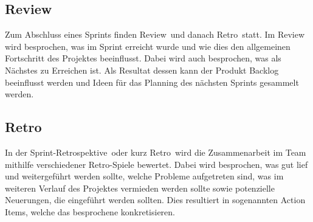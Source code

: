 \subsection{Review}
Zum Abschluss eines Sprints finden \glqq Review\grqq~und danach \glqq Retro\grqq~statt. Im Review wird besprochen, was im Sprint erreicht 
wurde und wie dies den allgemeinen Fortschritt des Projektes beeinflusst. Dabei wird auch besprochen, was als Nächstes zu Erreichen ist. 
Als Resultat dessen kann der Produkt Backlog beeinflusst werden und Ideen für das Planning des nächsten Sprints gesammelt werden. 

\subsection{Retro}
In der \glqq Sprint-Retrospektive\grqq~oder kurz \glqq Retro\grqq~wird die Zusammenarbeit im Team mithilfe verschiedener Retro-Spiele bewertet. 
Dabei wird besprochen, was gut lief und weitergeführt werden sollte, welche Probleme aufgetreten sind, was im weiteren Verlauf des Projektes 
vermieden werden sollte sowie potenzielle Neuerungen, die eingeführt werden sollten. Dies resultiert in sogenannten Action Items, welche das 
besprochene konkretisieren.
